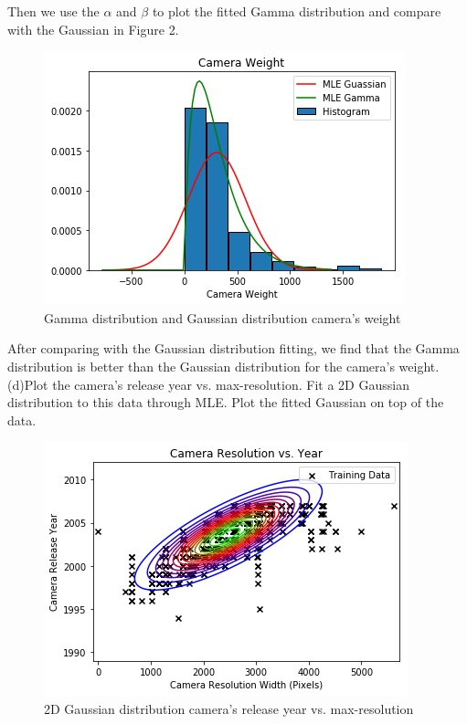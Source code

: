\documentclass{article}
\begin{document}
Then we use the $\alpha$ and $\beta$ to plot the fitted Gamma distribution and compare with the Gaussian in Figure 2.
\begin{figure}[ht]
\centering
\includegraphics[scale=0.5]{h5c.jpg}
\caption{ Gamma distribution and Gaussian distribution camera's weight}
\end{figure}
After comparing with the Gaussian distribution fitting, we find that the Gamma distribution is better than the Gaussian distribution for the camera's weight.
\newline
(d)Plot the camera's release year vs. max-resolution. Fit a 2D Gaussian distribution to this data through MLE. Plot the fitted Gaussian on top of the data.
\begin{figure}[ht]
\centering
\includegraphics[scale=0.5]{w5d.jpg}
\caption{ 2D Gaussian distribution camera's release year vs. max-resolution}
\end{figure}
\newline

%
%
\end{document}
